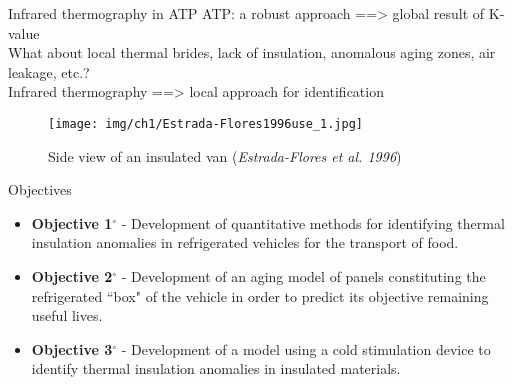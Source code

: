 \begin{frame}{Infrared thermography in ATP}
\small
ATP: a robust approach ==> \alert{global} result of K-value\\
\pause
What about local thermal brides, lack of insulation, anomalous aging zones, air leakage, etc.?\\
\pause
Infrared thermography ==> \alert{local} approach for identification
\pause
    \begin{figure}
        \centering
        \texttt{[image: img/ch1/Estrada-Flores1996use\_1.jpg]}
        \caption{Side view of an insulated van (\textit{Estrada-Flores et al. 1996})}
    \end{figure}
\end{frame}


\begin{frame}{Objectives}
    \begin{itemize}
        \item \textbf{Objective 1$ ^\circ $ } - Development of quantitative methods for identifying thermal insulation anomalies in refrigerated vehicles for the transport of food.
        \item \textbf{Objective 2$ ^\circ $ } - Development of an aging model of panels constituting the refrigerated ``box" of the vehicle in order to predict its objective remaining useful lives. 
        \item \textbf{Objective 3$ ^\circ $ } - Development of a model using a cold stimulation device to identify thermal insulation anomalies in insulated materials.
    \end{itemize}
\end{frame}
